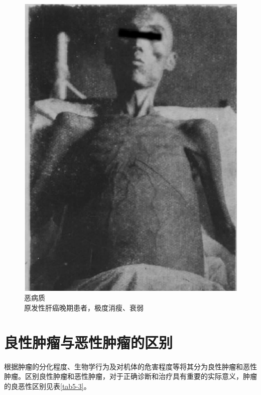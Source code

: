 \begin{figure}[!htbp]
  \centering
  \includegraphics{./images/Image00079.jpg}
  \caption{恶病质 \\ {\small 原发性肝癌晚期患者，极度消瘦、衰弱}}
  \label{fig5-12}
\end{figure}



\section{良性肿瘤与恶性肿瘤的区别}

根据肿瘤的分化程度、生物学行为及对机体的危害程度等将其分为良性肿瘤和恶性肿瘤。区别良性肿瘤和恶性肿瘤，对于正确诊断和治疗具有重要的实际意义，肿瘤的良恶性区别见表\ref{tab5-3}。

